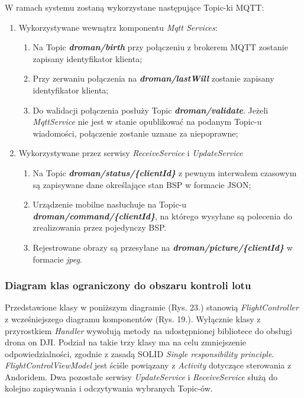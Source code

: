   W ramach systemu zostaną wykorzystane następujące Topic-ki MQTT:
  \begin{enumerate}
  \item Wykorzystywane wewnątrz komponentu \textit{Mqtt Services}:\begin{enumerate}
  \item Na Topic \textit{\textbf{droman/birth}} przy połączeniu z brokerem MQTT zostanie zapisany identyfikator klienta;
  \item Przy zerwaniu połączenia na \textit{\textbf{droman/lastWill}} zostanie zapisany identyfikator klienta;
  \item Do walidacji połączenia posłuży Topic \textit{\textbf{droman/validate}}. Jeżeli \textit{MqttService} nie jest w stanie opublikować na podanym Topic-u wiadomości, połączenie zostanie uznane za niepoprawne;\end{enumerate}
  \item Wykorzystywane przez serwisy \textit{ReceiveService} i \textit{UpdateService}\begin{enumerate}
  \item Na Topic \textit{\textbf{droman/status/\{clientId\}}} z pewnym interwałem czasowym są zapisywane dane określające stan BSP w formacie JSON;
  \item Urządzenie mobilne nasłuchuje na Topic-u\\ \textit{\textbf{droman/command/\{clientId\}}}, na którego wysyłane są polecenia do zrealizowania przez pojedynczy BSP.
  \item Rejestrowane obrazy są przesyłane na \textit{\textbf{droman/picture/\{clientId\}}} w formacie \textit{jpeg}.
  \end{enumerate}
\end{enumerate}
\newpage

\subsubsection{Diagram klas ograniczony do obszaru kontroli lotu}
  
Przedstawione klasy w poniższym diagramie (Rys. 23.) stanowią \textit{FlightController} z wcześniejszego diagramu komponentów (Rys. 19.). Wyłącznie klasy z przyrostkiem \textit{Handler} wywołują metody na udostępnionej bibliotece do obsługi drona on DJI. Podział na takie trzy klasy ma na celu zmniejszenie odpowiedzialności, zgodnie z zasadą SOLID \textit{Single responsibility principle}. \textit{FlightControlViewModel} jest ściśle powiązany z \textit{Activity} dotyczące sterowania z Andoridem. Dwa pozostałe serwisy \textit{UpdateService} i \textit{ReceiveService} służą do kolejno zapisywania i odczytywania wybranych Topic-ów.

